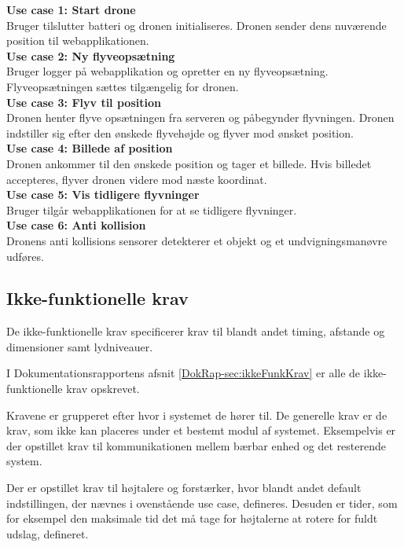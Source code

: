 \textbf{Use case 1: Start drone} \\
Bruger tilslutter batteri og dronen initialiseres. Dronen sender dens nuværende position til webapplikationen.\\

\textbf{Use case 2: Ny flyveopsætning} \\
Bruger logger på webapplikation og opretter en ny flyveopsætning. Flyveopsætningen sættes tilgængelig for dronen.\\

\textbf{Use case 3: Flyv til position}\\
Dronen henter flyve opsætningen fra serveren og påbegynder flyvningen. Dronen indstiller sig efter den ønskede flyvehøjde og flyver mod ønsket position. \\

\textbf{Use case 4: Billede af position} \\
Dronen ankommer til den ønskede position og tager et billede. Hvis billedet accepteres, flyver dronen videre mod næste koordinat. \\

\textbf{Use case 5: Vis tidligere flyvninger} \\
Bruger tilgår webapplikationen for at se tidligere flyvninger.\\

\textbf{Use case 6: Anti kollision} \\
Dronens anti kollisions sensorer detekterer et objekt og et undvigningsmanøvre udføres. \\

\newpage
\subsection{Ikke-funktionelle krav}




De ikke-funktionelle krav specificerer krav til blandt andet timing, afstande og dimensioner samt lydniveauer. 

I Dokumentationsrapportens afsnit \vref{DokRap-sec:ikkeFunkKrav} er alle de ikke-funktionelle krav opskrevet.

Kravene er grupperet efter hvor i systemet de hører til. De generelle krav er de krav, som ikke kan placeres under et bestemt modul af systemet. Eksempelvis er der opstillet krav til kommunikationen mellem bærbar enhed og det resterende system.

Der er opstillet krav til højtalere og forstærker, hvor blandt andet default indstillingen, der nævnes i ovenstående use case, defineres.\newline
Desuden er tider, som for eksempel den maksimale tid det må tage for højtalerne at rotere for fuldt udslag, defineret.

